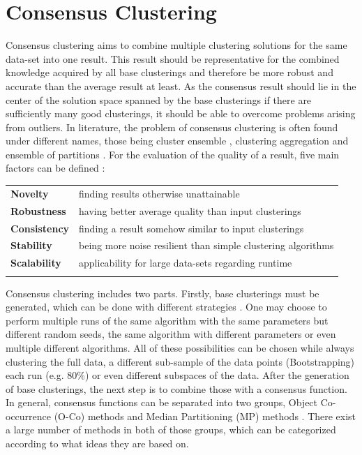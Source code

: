 \documentclass[
	a4paper,
	english,
	twoside,
	openright,               
	11pt                            
	]{report}
\begin{document}

\section{Consensus Clustering}\label{sec:consensus}
Consensus clustering aims to combine multiple clustering solutions for the same data-set into one result. This result should be representative for the combined knowledge acquired by all base clusterings and therefore be more robust and accurate than the average result at least. As the consensus result should lie in the center of the solution space spanned by the base clusterings if there are sufficiently many good clusterings, it should be able to overcome problems arising from outliers. In literature, the problem of consensus clustering is often found under different names, those being cluster ensemble \cite{BOONGOEN20181}, clustering aggregation \cite{Gionis2005ClusteringA} and ensemble of partitions \cite{ensemblepartitions}. For the evaluation of the quality of a result, five main factors can be defined \cite{Ghaemi2009ASC,survey1}:\newline

\begin{table}[ht]

\begin{tabular}{ll}
	\textbf{Novelty} & finding results otherwise unattainable \\
	\textbf{Robustness} & having better average quality than input clusterings \\
	\textbf{Consistency}   & finding a result somehow similar to input clusterings \\
	\textbf{Stability} & being more noise resilient than simple clustering algorithms \\
	\textbf{Scalability} & applicability for large data-sets regarding runtime \\
	&
\end{tabular}
\end{table}

Consensus clustering includes two parts. Firstly, base clusterings must be generated, which can be done with different strategies \cite{BOONGOEN20181}. One may choose to perform multiple runs of the same algorithm with the same parameters but different random seeds, the same algorithm with different parameters or even multiple different algorithms. All of these possibilities can be chosen while always clustering the full data, a different sub-sample of the data points (Bootstrapping) \cite{bootstrapping} each run (e.g. 80\%) or even different subspaces of the data. After the generation of base clusterings, the next step is to combine those with a consensus function. In general, consensus functions can be separated into two groups, Object Co-occurrence (O-Co) methods and Median Partitioning (MP) methods \cite{survey1}. There exist a large number of methods in both of those groups, which can be categorized according to what ideas they are based on.
\end{document}
